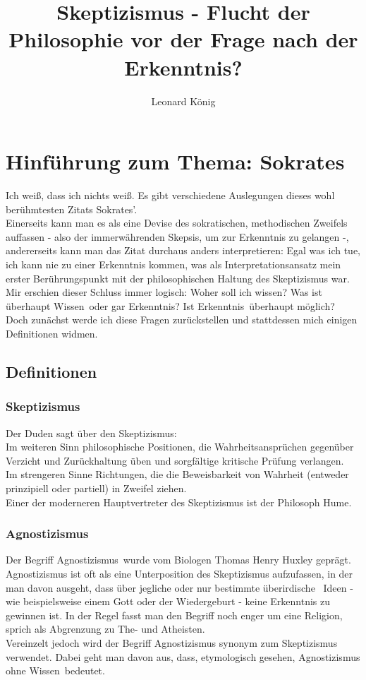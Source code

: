 \documentclass[12pt,a4paper]{article}
\author{Leonard König}
\title{Skeptizismus - Flucht der Philosophie vor der Frage nach der Erkenntnis?}
\begin{document}
\maketitle
\tableofcontents
\newpage
%
\section{Hinführung zum Thema: Sokrates}
\glqq Ich weiß, dass ich nichts weiß\grqq. Es gibt verschiedene Auslegungen dieses wohl berühmtesten Zitats Sokrates'.%
\\Einerseits kann man es als eine Devise des sokratischen, methodischen Zweifels auffassen - also der immerwährenden Skepsis, um zur Erkenntnis zu gelangen -, andererseits kann man das Zitat durchaus anders interpretieren: Egal was ich tue, ich kann nie zu einer Erkenntnis kommen, was als Interpretationsansatz mein erster Berührungspunkt mit der philosophischen Haltung des Skeptizismus war.\\
Mir erschien dieser Schluss immer logisch: Woher soll ich \glqq wissen\grqq? Was ist überhaupt \glqq Wissen\grqq\ oder gar \glqq Erkenntnis\grqq ? Ist \glqq Erkenntnis\grqq\ überhaupt möglich?\\
Doch zunächst werde ich diese Fragen zurückstellen und stattdessen mich einigen Definitionen widmen.
	\subsection{Definitionen}
		\subsubsection{Skeptizismus}
Der Duden sagt über den Skeptizismus:\\
\glqq Im weiteren Sinn philosophische Positionen, die Wahrheitsansprüchen gegenüber Verzicht und Zurückhaltung üben und sorgfältige kritische Prüfung verlangen.\\
Im strengeren Sinne Richtungen, die die Beweisbarkeit von Wahrheit (entweder prinzipiell oder partiell) in Zweifel ziehen.\grqq \\
Einer der moderneren Hauptvertreter des Skeptizismus ist der Philosoph Hume.%
		\subsubsection{Agnostizismus}
Der Begriff \glqq Agnostizismus\grqq\ wurde vom Biologen Thomas Henry Huxley geprägt. Agnostizismus ist oft als eine Unterposition des Skeptizismus aufzufassen, in der man davon ausgeht, dass über jegliche oder nur bestimmte überirdische%
\ Ideen - wie beispielsweise einem Gott oder der Wiedergeburt - keine Erkenntnis zu gewinnen ist. In der Regel fasst man den Begriff noch enger um eine Religion, sprich als Abgrenzung zu The- und Atheisten.\\ 
Vereinzelt jedoch wird der Begriff Agnostizismus synonym zum Skeptizismus verwendet. Dabei geht man davon aus, dass, etymologisch gesehen, Agnostizismus \glqq ohne Wissen\grqq\ bedeutet.
\end{document}
